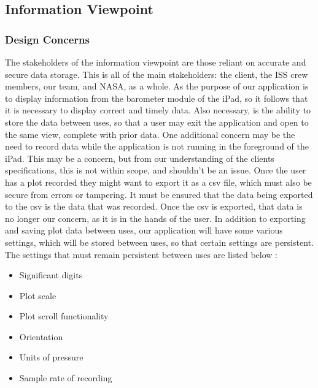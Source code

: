 \documentclass[onecolumn, draftclsnofoot,10pt, compsoc]{IEEEtran}
\begin{document}
\subsection{Information Viewpoint}
\subsubsection{Design Concerns}
The stakeholders of the information viewpoint are those reliant on accurate and secure data storage.
This is all of the main stakeholders: the client, the ISS crew members, our team, and NASA, as a whole.
As the purpose of our application is to display information from the barometer module of the iPad, so it follows that it is necessary to display correct and timely data.
Also necessary, is the ability to store the data between uses, so that a user may exit the application and open to the same view, complete with prior data.
One additional concern may be the need to record data while the application is not running in the foreground of the iPad.
This may be a concern, but from our understanding of the clients specifications, this is not within scope, and shouldn't be an issue.
Once the user has a plot recorded they might want to export it as a csv file, which must also be secure from errors or tampering.
It must be ensured that the data being exported to the csv is the data that was recorded.
Once the csv is exported, that data is no longer our concern, as it is in the hands of the user.
In addition to exporting and saving plot data between uses, our application will have some various settings, which will be stored between uses, so that certain settings are persistent.
The settings that must remain persistent between uses are listed below \cite{reqDoc}:
\begin{itemize}
	\item Significant digits
	\item Plot scale
	\item Plot scroll functionality
	\item Orientation
	\item Units of pressure
	\item Sample rate of recording
\end{itemize}
\end{document}
